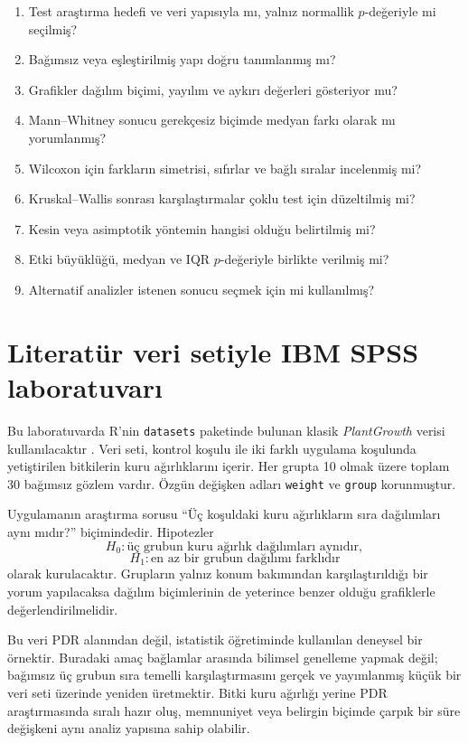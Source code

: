 \begin{enumerate}
  \item Test araştırma hedefi ve veri yapısıyla mı, yalnız normallik $p$-değeriyle mi seçilmiş?
  \item Bağımsız veya eşleştirilmiş yapı doğru tanımlanmış mı?
  \item Grafikler dağılım biçimi, yayılım ve aykırı değerleri gösteriyor mu?
  \item Mann--Whitney sonucu gerekçesiz biçimde medyan farkı olarak mı yorumlanmış?
  \item Wilcoxon için farkların simetrisi, sıfırlar ve bağlı sıralar incelenmiş mi?
  \item Kruskal--Wallis sonrası karşılaştırmalar çoklu test için düzeltilmiş mi?
  \item Kesin veya asimptotik yöntemin hangisi olduğu belirtilmiş mi?
  \item Etki büyüklüğü, medyan ve IQR $p$-değeriyle birlikte verilmiş mi?
  \item Alternatif analizler istenen sonucu seçmek için mi kullanılmış?
\end{enumerate}

\section{Literatür veri setiyle IBM SPSS laboratuvarı}

Bu laboratuvarda R'nin \texttt{datasets} paketinde bulunan klasik
\emph{PlantGrowth} verisi kullanılacaktır \cite{dobson1983}. Veri seti,
kontrol koşulu ile iki farklı uygulama koşulunda yetiştirilen bitkilerin kuru
ağırlıklarını içerir. Her grupta 10 olmak üzere toplam 30 bağımsız gözlem
vardır. Özgün değişken adları \texttt{weight} ve \texttt{group} korunmuştur.

Uygulamanın araştırma sorusu ``Üç koşuldaki kuru ağırlıkların sıra dağılımları
aynı mıdır?'' biçimindedir. Hipotezler
\[
H_0:\text{üç grubun kuru ağırlık dağılımları aynıdır},
\]
\[
H_1:\text{en az bir grubun dağılımı farklıdır}
\]
olarak kurulacaktır. Grupların yalnız konum bakımından karşılaştırıldığı bir
yorum yapılacaksa dağılım biçimlerinin de yeterince benzer olduğu grafiklerle
değerlendirilmelidir.

\begin{researchbox}
Bu veri PDR alanından değil, istatistik öğretiminde kullanılan deneysel bir
örnektir. Buradaki amaç bağlamlar arasında bilimsel genelleme yapmak değil;
bağımsız üç grubun sıra temelli karşılaştırmasını gerçek ve yayımlanmış küçük
bir veri seti üzerinde yeniden üretmektir. Bitki kuru ağırlığı yerine PDR
araştırmasında sıralı hazır oluş, memnuniyet veya belirgin biçimde çarpık bir
süre değişkeni aynı analiz yapısına sahip olabilir.
\end{researchbox}


